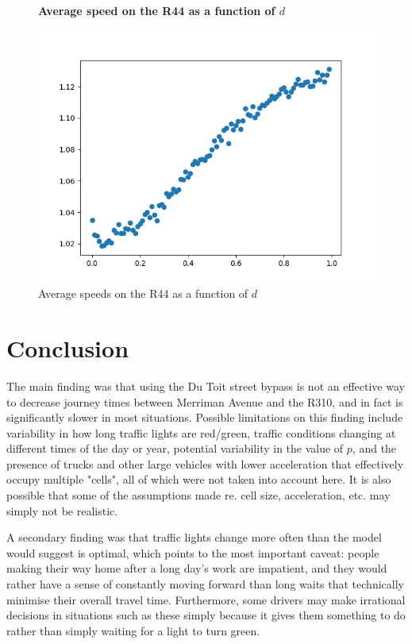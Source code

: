 \documentclass{article}
\begin{document}
\begin{figure}
\textbf{\large Average speed on the R44 as a function of $d$}\par\medskip
{}
\includegraphics[scale = 0.55, left]{./data/phase4/v_vs_d.png}
\vspace*{0.1cm}\hspace*{4.5cm}{\large $d$}
\caption{\label{fig} Average speeds on the R44 as a function of $d$}
\end{figure}

\section*{Conclusion}

The main finding was that using the Du Toit street bypass is not an effective way to decrease journey times between Merriman Avenue and the R310, and in fact is significantly slower in most situations. Possible limitations on this finding include variability in how long traffic lights are red/green, traffic conditions changing at different times of the day or year, potential variability in the value of $p$, and the presence of trucks and other large vehicles with lower acceleration that effectively occupy multiple "cells", all of which were not taken into account here. It is also possible that some of the assumptions made re. cell size, acceleration, etc. may simply not be realistic.

A secondary finding was that traffic lights change more often than the model would suggest is optimal, which points to the most important caveat: people making their way home after a long day's work are impatient, and they would rather have a sense of constantly moving forward than long waits that technically minimise their overall travel time. Furthermore, some drivers may make irrational decisions in situations such as these simply because it gives them something to do rather than simply waiting for a light to turn green.
\end{document}
